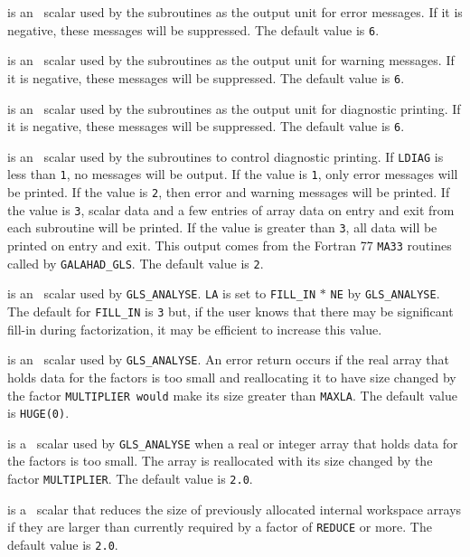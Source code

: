 \documentclass{galahad}
\newcommand{\packagename}{GLS}
\begin{document}
\begin{description}

 is an \integer\ scalar used by the subroutines as the output
 unit for error messages.  If it is negative, these
 messages will be suppressed.  The default value is {\tt 6}.

 is an \integer\ scalar used by the subroutines as the output
 unit for warning messages.  If it is negative, these messages 
 will be suppressed.  The default value is {\tt 6}.

 is an \integer\ scalar used by the subroutines as the output
 unit for diagnostic printing.  If it is negative, these messages 
 will be suppressed.  The default value is {\tt 6}.

 is an \integer\ scalar used by the subroutines to control
 diagnostic printing.  If {\tt LDIAG} is less than {\tt 1}, no messages will
 be output. If the value is {\tt 1}, only error messages will
 be printed.  If the value is {\tt 2}, then error and warning messages will
 be printed. If the value is {\tt 3}, scalar data and a few
 entries of array data on entry and exit from each subroutine will be
 printed.  If the value is greater than {\tt 3}, all data will be printed on 
 entry and exit.  This output comes from the Fortran 77 {\tt MA33} routines
 called by {\tt GALAHAD\_\packagename}. The default value is {\tt 2}.

 is an \integer\ scalar used by {\tt \packagename\_ANALYSE}. 
{\tt LA} is set to
{\tt FILL\_IN} $\ast$ {\tt NE} by {\tt \packagename\_ANALYSE}. The default for
{\tt FILL\_IN} is {\tt 3} but, if the user knows that 
there may be significant fill-in during factorization, it may be efficient 
to increase this value.

 is an \integer\ scalar used by {\tt \packagename\_ANALYSE}. An error
return occurs if the real array that holds data for the factors is too
small and reallocating it to have size changed by the factor {\tt MULTIPLIER
would} make its size greater than {\tt MAXLA}. The default value is
{\tt HUGE(0)}.

 is a \realdp\ scalar used by {\tt \packagename\_ANALYSE} when a
real or integer array that holds data for the factors is too small. The
array is reallocated with its size changed by the factor {\tt MULTIPLIER}.
The default value is {\tt 2.0}.

 is a \realdp\ scalar that reduces the size of previously allocated
internal workspace arrays if they are larger than currently required
by a factor of {\tt REDUCE} or more. The default value is {\tt 2.0}.


\end{description}
\end{document}
